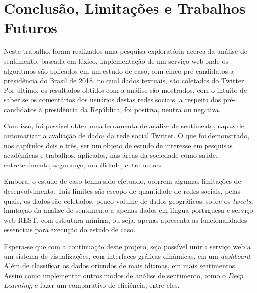 \chapter{Conclusão, Limitações e Trabalhos Futuros}

Neste trabalho, foram realizados uma pesquisa exploratória acerca da análise de sentimento, baseada em léxico, implementação de um serviço web onde os algoritmos são aplicados em um estudo de caso, com cinco pré-candidatos a presidência do Brasil de 2018, no qual dados textuais, são coletados do Twitter. Por último, os resultados obtidos com a análise são mostrados, com o intuito de saber se os comentários dos usuários destas redes sociais, a respeito dos pré-candidatos à presidência da República, foi positiva, neutra ou negativa.

Com isso, foi possível obter uma ferramenta de análise de sentimento, capaz de automatizar a avaliação de dados da rede social Twitter. O que foi demonstrado, nos capítulos dois e três, ser um objeto de estudo de interesse em pesquisas acadêmicas e trabalhos, aplicados, nas áreas da sociedade como saúde, entretenimento, segurança, mobilidade, entre outros.

Embora, o estudo de caso tenha sido efetuado, ocorrem algumas limitações de desenvolvimento. Tais limites são escopo de quantidade de redes sociais, pelas quais, os dados são coletados, pouco volume de dados geográficos, sobre os \textit{tweets}, limitação da análise de sentimento a apenas dados em língua portuguesa e serviço web REST, com estrutura mínima, ou seja, apenas apresenta as funcionalidades essenciais para execução do estudo de caso.

Espera-se que com a continuação deste projeto, seja possível unir o serviço web a um sistema de visualizações, com interfaces gráficas dinâmicas, em um \textit{dashboard}. Além de classificar os dados oriundos de mais idiomas, em mais sentimentos. Assim como implementar outros modos de análise de sentimento, como o \textit{Deep Learning}, e fazer um comparativo de eficiência, entre eles.






